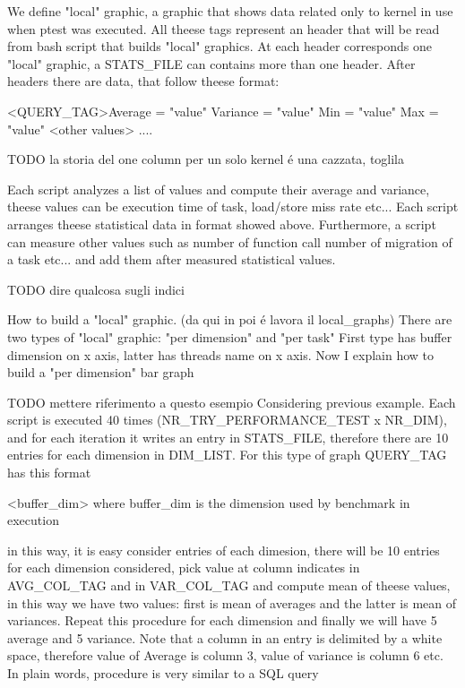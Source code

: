 \documentclass[a4paper,10pt]{article}
\begin{document}
\begin{multicols}{2}
We define "local" graphic, a graphic that shows data related only to 
kernel in use when ptest was executed.
All theese tags represent an header that will be read from bash script that builds 
"local" graphics. At each header corresponds one "local" graphic, a STATS\_FILE can 
contains more than one header. 
After headers there are data, that follow theese format:


<QUERY\_TAG>Average = "value" Variance = "value" Min = "value" Max = "value" <other values>
....

TODO la storia del one column per un solo kernel \'e una cazzata, toglila

Each script analyzes a list of values and compute their average and variance,
theese values can be execution time of task, load/store miss rate etc...
Each script arranges theese statistical data in format showed above.
Furthermore, a script can measure other values such as number of function call
number of migration of a task etc... and add them after measured statistical values.

TODO dire qualcosa sugli indici 

How to build a "local" graphic. (da qui in poi \'e lavora il local\_graphs)
There are two types of "local" graphic: "per dimension"  and "per task" 
First type has buffer dimension on x axis, latter has threads name on x axis.
Now I explain how to build a "per dimension" bar graph

TODO mettere riferimento a questo esempio
Considering previous example. Each script is executed 40 times 
(NR\_TRY\_PERFORMANCE\_TEST x NR\_DIM), and for each iteration 
it writes an entry in STATS\_FILE, therefore there are 10 entries for each 
dimension in DIM\_LIST. For this type of graph QUERY\_TAG has this format

<buffer\_dim> where buffer\_dim is the dimension used by benchmark in execution

in this way, it is easy consider entries of each dimesion, there will be 10 entries for each 
dimension considered, pick value at column indicates in AVG\_COL\_TAG  and in VAR\_COL\_TAG 
and compute mean of theese values, in this way we have two values: first is mean
of averages and the latter is mean of variances. Repeat this procedure for each dimension and finally we
will have 5 average and 5 variance. Note that a column in an entry is delimited by 
a white space, therefore value of Average is column 3, value of variance is column 6 etc.
In plain words, procedure is very similar to a SQL query


\end{multicols}
\end{document}
